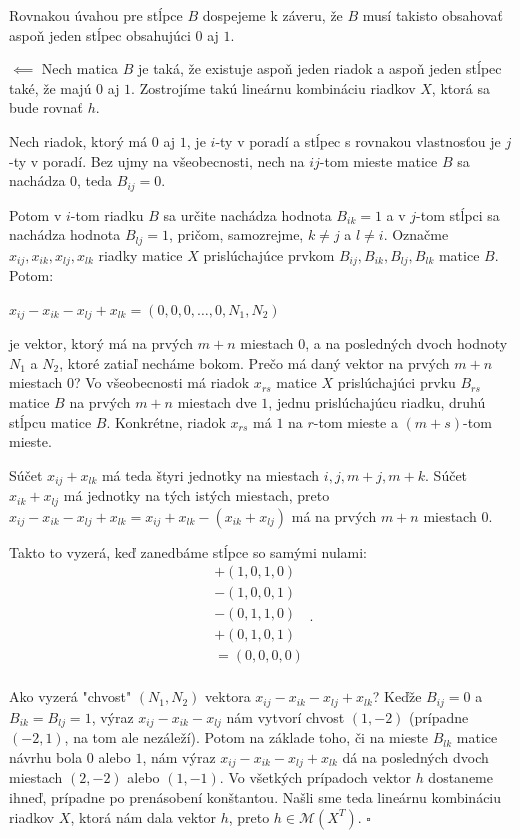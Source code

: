 \begin{dokaz}
Rovnakou úvahou pre stĺpce $B$ dospejeme k záveru,
že $B$ musí takisto obsahovať aspoň jeden stĺpec obsahujúci $0$ aj $1$.

$\boxed{\impliedby}$ Nech matica $B$ je taká, že existuje aspoň jeden riadok a aspoň jeden stĺpec také, že majú $0$ aj $1$.
Zostrojíme takú lineárnu kombináciu riadkov $X$, ktorá sa bude rovnať $h$.

Nech riadok, ktorý má $0$ aj $1$, je $i$-ty v poradí a stĺpec s rovnakou vlastnosťou je $j$-ty v poradí.
Bez ujmy na všeobecnosti, nech na $ij$-tom mieste matice $B$ sa nachádza $0$, teda $B_{ij} = 0$.

Potom v $i$-tom riadku $B$ sa určite nachádza hodnota $B_{ik} = 1$ a v $j$-tom stĺpci sa nachádza hodnota $B_{lj} = 1$,
pričom, samozrejme, $k \neq j$ a $l \neq i$.
Označme $x_{ij}, x_{ik}, x_{lj}, x_{lk}$ riadky matice $X$ prislúchajúce prvkom $B_{ij}, B_{ik}, B_{lj}, B_{lk}$ matice $B$. Potom:

\begin{center}
$
x_{ij} - x_{ik} - x_{lj} + x_{lk} = (0, 0, 0, \ldots, 0, N_1, N_2)
$
\end{center}
je vektor, ktorý má na prvých $m + n$ miestach $0$, a na posledných dvoch hodnoty $N_1$ a $N_2$, ktoré zatiaľ necháme bokom.
Prečo má daný vektor na prvých $m + n$ miestach $0$?
Vo všeobecnosti má riadok $x_{rs}$ matice $X$ prislúchajúci prvku $B_{rs}$ matice $B$ na prvých $m + n$ miestach dve $1$,
jednu prislúchajúcu riadku, druhú stĺpcu matice $B$. Konkrétne, riadok $x_{rs}$ má $1$ na $r$-tom mieste a $(m + s)$-tom mieste.

Súčet $x_{ij} + x_{lk}$ má teda štyri jednotky na miestach $i, j, m + j, m + k$.
Súčet $x_{ik} + x_{lj}$ má jednotky na tých istých miestach, 
preto $x_{ij} - x_{ik} - x_{lj} + x_{lk} = x_{ij} + x_{lk} - (x_{ik} + x_{lj})$ má na prvých $m + n$ miestach $0$.

Takto to vyzerá, keď zanedbáme stĺpce so samými nulami:
\[
\begin{split}
+(1, 0, 1, 0) \\
-(1, 0, 0, 1) \\
-(0, 1, 1, 0) \\
+(0, 1, 0, 1) \\
=(0, 0, 0, 0) \\
\end{split}
.
\]

Ako vyzerá "chvost" $(N_1, N_2)$ vektora $x_{ij} - x_{ik} - x_{lj} + x_{lk}$? Keďže $B_{ij} = 0$ a $B_{ik} = B_{lj} = 1$,
výraz $x_{ij} - x_{ik} - x_{lj}$ nám vytvorí chvost $(1, -2)$ (prípadne $(-2, 1)$, na tom ale nezáleží).
Potom na základe toho, či na mieste $B_{lk}$ matice návrhu bola $0$ alebo $1$,
nám výraz $x_{ij} - x_{ik} - x_{lj} + x_{lk}$ dá na posledných dvoch miestach $(2, -2)$ alebo $(1, -1)$.
Vo všetkých prípadoch vektor $h$ dostaneme ihneď, prípadne po prenásobení konštantou.
Našli sme teda lineárnu kombináciu riadkov $X$, ktorá nám dala vektor $h$, preto $h \in \mathcal{M}(X^T)$. $\square$

\end{dokaz}

